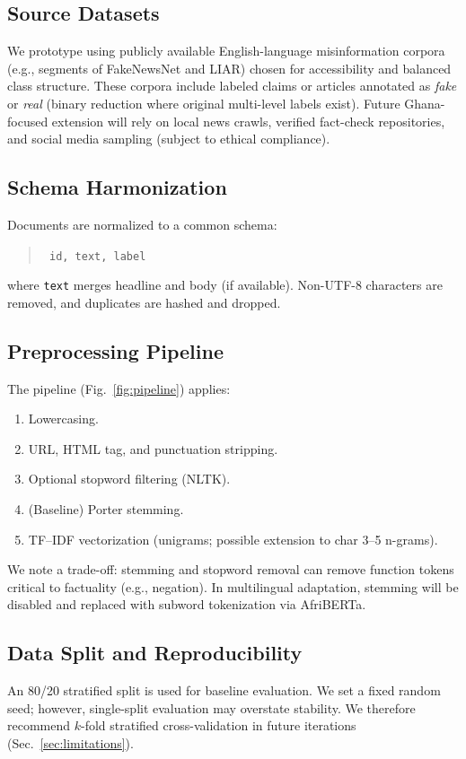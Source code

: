 \documentclass[runningheads]{llncs}
\begin{document}
\subsection{Source Datasets} We prototype using publicly available English-language misinformation corpora (e.g., segments of FakeNewsNet and LIAR) chosen for accessibility and balanced class structure. These corpora include labeled claims or articles annotated as \emph{fake} or \emph{real} (binary reduction where original multi-level labels exist). Future Ghana-focused extension will rely on local news crawls, verified fact-check repositories, and social media sampling (subject to ethical compliance). \subsection{Schema Harmonization} Documents are normalized to a common schema: \begin{quote} \texttt{ id, text, label } \end{quote} where \texttt{text} merges headline and body (if available). Non-UTF-8 characters are removed, and duplicates are hashed and dropped. \subsection{Preprocessing Pipeline} The pipeline (Fig.~\ref{fig:pipeline}) applies: \begin{enumerate}[nosep] \item Lowercasing. \item URL, HTML tag, and punctuation stripping. \item Optional stopword filtering (NLTK). \item (Baseline) Porter stemming. \item TF--IDF vectorization (unigrams; possible extension to char 3--5 n-grams). \end{enumerate} We note a trade-off: stemming and stopword removal can remove function tokens critical to factuality (e.g., negation). In multilingual adaptation, stemming will be disabled and replaced with subword tokenization via AfriBERTa. \subsection{Data Split and Reproducibility} An 80/20 stratified split is used for baseline evaluation. We set a fixed random seed; however, single-split evaluation may overstate stability. We therefore recommend $k$-fold stratified cross-validation in future iterations (Sec.~\ref{sec:limitations}).
\end{document}
